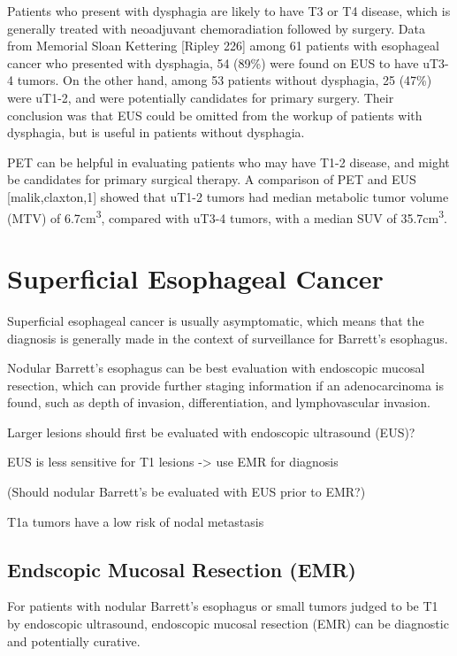 \documentclass[
]{book}
\begin{document}
Patients who present with dysphagia are likely to have T3 or T4 disease, which is generally treated with neoadjuvant chemoradiation followed by surgery. Data from Memorial Sloan Kettering {[}Ripley 226{]} among 61 patients with esophageal cancer who presented with dysphagia, 54 (89\%) were found on EUS to have uT3-4 tumors. On the other hand, among 53 patients without dysphagia, 25 (47\%) were uT1-2, and were potentially candidates for primary surgery. Their conclusion was that EUS could be omitted from the workup of patients with dysphagia, but is useful in patients without dysphagia.

PET can be helpful in evaluating patients who may have T1-2 disease, and might be candidates for primary surgical therapy. A comparison of PET and EUS {[}malik,claxton,1{]} showed that uT1-2 tumors had median metabolic tumor volume (MTV) of 6.7cm\textsuperscript{3}, compared with uT3-4 tumors, with a median SUV of 35.7cm\textsuperscript{3}.

\hypertarget{superficial}{%
\chapter{Superficial Esophageal Cancer}\label{superficial}}

Superficial esophageal cancer is usually asymptomatic, which means that the diagnosis is generally made in the context of surveillance for Barrett's esophagus.

Nodular Barrett's esophagus can be best evaluation with endoscopic mucosal resection, which can provide further staging information if an adenocarcinoma is found, such as depth of invasion, differentiation, and lymphovascular invasion.

Larger lesions should first be evaluated with endoscopic ultrasound (EUS)?

EUS is less sensitive for T1 lesions \citep{bergeron765} -\textgreater{} use EMR for diagnosis \citep{maish1777}

(Should nodular Barrett's be evaluated with EUS prior to EMR?)

T1a tumors have a low risk of nodal metastasis \citep{dunbar850}

\hypertarget{emr}{%
\section{Endscopic Mucosal Resection (EMR)}\label{emr}}

For patients with nodular Barrett's esophagus or small tumors judged to be T1 by endoscopic ultrasound, endoscopic mucosal resection (EMR) can be diagnostic and potentially curative.\citep{thomas1609}
\end{document}
